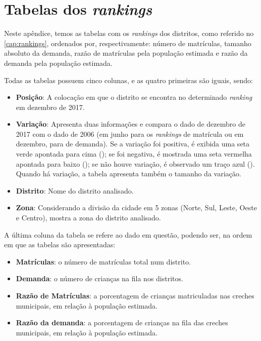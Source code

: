 \chapter{Tabelas dos \textit{rankings}}
\label{apend:rankings}

Neste apêndice, temos as tabelas com os \textit{rankings} dos distritos, como referido no \autoref{cap:rankings}, ordenados por, respectivamente: número de matrículas, tamanho absoluto da demanda, razão de matrículas pela população estimada e razão da demanda pela população estimada.

Todas as tabelas possuem cinco colunas, e as quatro primeiras são iguais, sendo:

\begin{itemize}
	\item \textbf{Posição}: A colocação em que o distrito se encontra no determinado \textit{ranking} em dezembro de 2017.
	\item \textbf{Variação}: Apresenta duas informações e compara o dado de dezembro de 2017 com o dado de 2006 (em junho para os \textit{rankings} de matrícula ou em dezembro, para de demanda). Se a variação foi positiva, é exibida uma seta verde apontada para cima (\aumento); se foi negativa, é mostrada uma seta vermelha apontada para baixo (\queda); se não houve variação, é observado um traço azul (\mesmo). Quando há variação, a tabela apresenta também o tamanho da variação.
	\item \textbf{Distrito}: Nome do distrito analisado.
	\item \textbf{Zona}: Considerando a divisão da cidade em 5 zonas (Norte, Sul, Leste, Oeste e Centro), mostra a zona do distrito analisado.
\end{itemize}

A última coluna da tabela se refere ao dado em questão, podendo ser, na ordem em que as tabelas são apresentadas:

\begin{itemize}
	\item \textbf{Matrículas}: o número de matrículas total num distrito.
	\item \textbf{Demanda}: o número de crianças na fila nos distritos.
	\item \textbf{Razão de Matrículas}: a porcentagem de crianças matriculadas nas creches municipais, em relação à população estimada.
	\item \textbf{Razão da demanda}: a porcentagem de crianças na fila das creches municipais, em relação à população estimada.
\end{itemize}